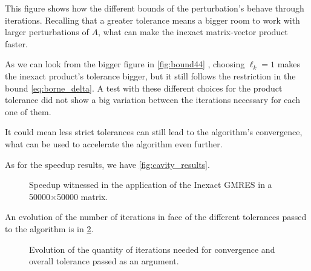 This figure shows how the different bounds of the perturbation's behave through iterations. Recalling that a greater tolerance means a bigger room to work with larger perturbations of $A$, what can make the inexact matrix-vector product faster.

As we can look from the bigger figure in \autoref{fig:bound44} , choosing $\ell_{k} = 1$ makes the inexact product's tolerance bigger, but it still follows the restriction in the bound \ref{eq:borne_delta}. A test with these different choices for the product tolerance did not show a big variation between the iterations necessary for each one of them.

It could mean less strict tolerances can still lead to the algorithm's convergence, what can be used to accelerate the algorithm even further.

As for the speedup results, we have \autoref{fig:cavity_results}.

\begin{figure}[h!]
    \centering
    
    \caption{Speedup witnessed in the application of the Inexact GMRES in a 50000×50000 matrix.}
    \label{fig:cavity_results}
\end{figure}

An evolution of the number of iterations in face of the different tolerances passed to the algorithm is in \ref{fig:cavity_iterations}.

\begin{figure}[h!]
    \centering
    
    \caption{Evolution of the quantity of iterations needed for convergence and overall tolerance passed as an argument.}
    \label{fig:cavity_iterations}
\end{figure}



